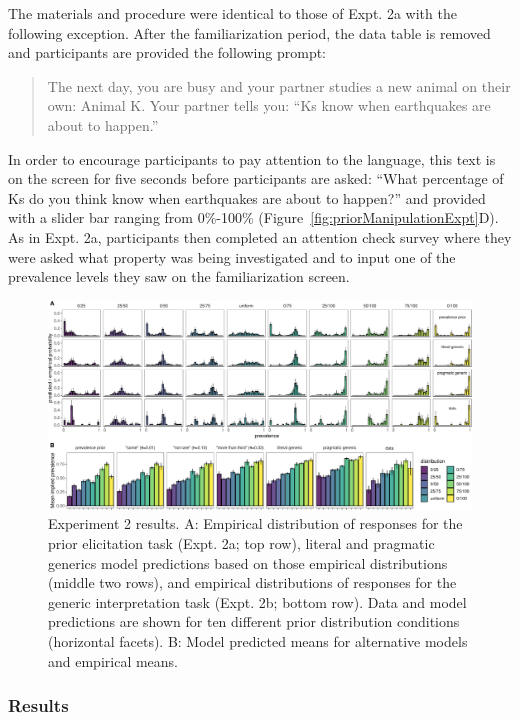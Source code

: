 \documentclass[floatsintext,doc]{apa6}
\begin{document}
The materials and procedure were identical to those of Expt. 2a with the following exception.
After the familiarization period, the data table is removed and participants are provided the following prompt:

\begin{quote}
The next day, you are busy and your partner studies a new animal on their own: Animal K.
Your partner tells you: \enquote{Ks know when earthquakes are about to happen.}
\end{quote}

In order to encourage participants to pay attention to the language, this text is on the screen for five seconds before participants are asked: \enquote{What percentage of Ks do you think know when earthquakes are about to happen?} and provided with a slider bar ranging from 0\%-100\% (Figure~\ref{fig:priorManipulationExpt}D).
As in Expt. 2a, participants then completed an attention check survey where they were asked what property was being investigated and to input one of the prevalence levels they saw on the familiarization screen.

\begin{figure}
\centering
\includegraphics{genint_files/figure-latex/priorManipulationResults-1.pdf}
\caption{\label{fig:priorManipulationResults}Experiment 2 results. A: Empirical distribution of responses for the prior elicitation task (Expt. 2a; top row), literal and pragmatic generics model predictions based on those empirical distributions (middle two rows), and empirical distributions of responses for the generic interpretation task (Expt. 2b; bottom row). Data and model predictions are shown for ten different prior distribution conditions (horizontal facets). B: Model predicted means for alternative models and empirical means.}
\end{figure}

\hypertarget{results-2}{%
\subsubsection{Results}\label{results-2}}
\end{document}
